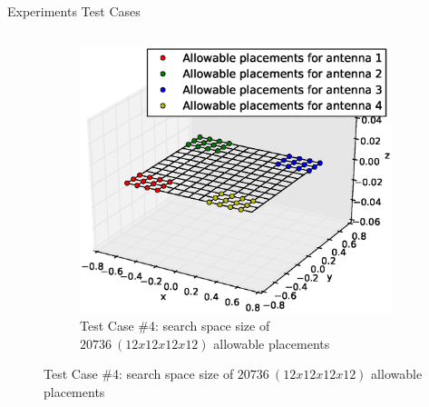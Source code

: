 \documentclass{beamer}
\begin{document}
\begin{frame}{Experiments Test Cases}
\begin{columns}
\begin{column}{.5\columnwidth}
\begin{figure}
\begin{subfigure}{\columnwidth}
                    \includegraphics[trim=0 30 0 50, clip, scale=0.25]{../paper/FIG/tc4_figure}%
                    \caption*{\tiny Test Case \#4: search space size of $20736~(12x12x12x12)$ allowable placements}%
                \end{subfigure}\hfill%
            \end{figure}
        \end{column}
    \end{columns}
\end{frame}
\end{document}
